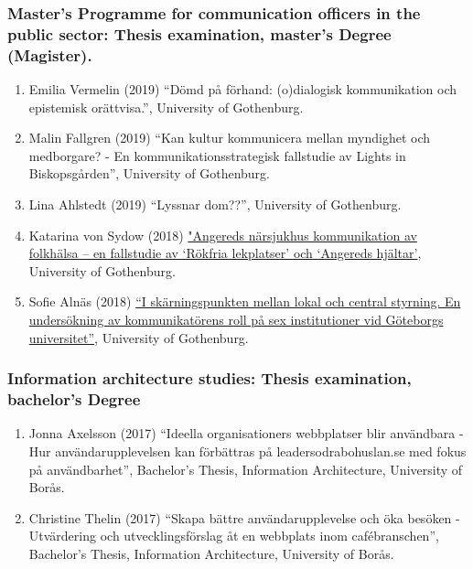 \documentclass[
]{article}
\providecommand{\tightlist}{%
  \setlength{\itemsep}{0pt}\setlength{\parskip}{0pt}}
\begin{document}
\hypertarget{masters-programme-for-communication-officers-in-the-public-sector-thesis-examination-masters-degree-magister.}{%
\subsubsection{Master's Programme for communication officers in the
public sector: Thesis examination, master's Degree
(Magister).}\label{masters-programme-for-communication-officers-in-the-public-sector-thesis-examination-masters-degree-magister.}}

\begin{enumerate}
\def\labelenumi{\arabic{enumi}.}
\tightlist
\item
  Emilia Vermelin (2019) ``Dömd på förhand: (o)dialogisk kommunikation
  och epistemisk orättvisa.'', University of Gothenburg.
\item
  Malin Fallgren (2019) ``Kan kultur kommunicera mellan myndighet och
  medborgare? - En kommunikationsstrategisk fallstudie av Lights in
  Biskopsgården'', University of Gothenburg.
\item
  Lina Ahlstedt (2019) ``Lyssnar dom??'', University of Gothenburg.
\item
  Katarina von Sydow (2018)
  \href{https://gupea.ub.gu.se/handle/2077/58013}{"Angereds närsjukhus
  kommunikation av folkhälsa -- en fallstudie av `Rökfria lekplatser'
  och `Angereds hjältar'}, University of Gothenburg.
\item
  Sofie Alnäs (2018) \href{https://gupea.ub.gu.se/handle/2077/58021}{``I
  skärningspunkten mellan lokal och central styrning. En undersökning av
  kommunikatörens roll på sex institutioner vid Göteborgs
  universitet''}, University of Gothenburg.
\end{enumerate}

\hypertarget{information-architecture-studies-thesis-examination-bachelors-degree}{%
\subsubsection{Information architecture studies: Thesis examination,
bachelor's
Degree}\label{information-architecture-studies-thesis-examination-bachelors-degree}}

\begin{enumerate}
\def\labelenumi{\arabic{enumi}.}
\tightlist
\item
  Jonna Axelsson (2017) ``Ideella organisationers webbplatser blir
  användbara - Hur användarupplevelsen kan förbättras på
  leadersodrabohuslan.se med fokus på användbarhet'', Bachelor's Thesis,
  Information Architecture, University of Borås.
\item
  Christine Thelin (2017) ``Skapa bättre användarupplevelse och öka
  besöken - Utvärdering och utvecklingsförslag åt en webbplats inom
  cafébranschen'', Bachelor's Thesis, Information Architecture,
  University of Borås.
\end{enumerate}
\end{document}
